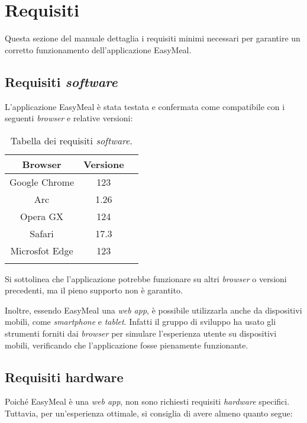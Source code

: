 \section{Requisiti}
Questa sezione del manuale dettaglia i requisiti minimi necessari per garantire 
un corretto funzionamento dell'applicazione EasyMeal.

\subsection{Requisiti \textit{software}}
L'applicazione EasyMeal è stata testata e confermata come compatibile con i 
seguenti \textit{browser} e relative versioni: 

\begin{longtable}{|c|c|c|}
	\hline
	\textbf{Browser}       & \textbf{ Versione}    \\
	\hline
    Google Chrome             & 123                    \\
    \hline
    Arc                       & 1.26                    \\
    \hline
    Opera GX                       & 124                    \\
    \hline
    Safari                        & 17.3                    \\
    \hline
    Microsfot Edge                 & 123                      \\
    \hline

    \caption{Tabella dei requisiti \textit{software}.}
\end{longtable}

Si sottolinea che l'applicazione potrebbe funzionare su altri \textit{browser} o versioni 
precedenti, ma il pieno supporto non è garantito.

Inoltre, essendo EasyMeal una \textit{web app}, è possibile utilizzarla anche
da dispositivi mobili, come \textit{smartphone} e \textit{tablet}. Infatti il gruppo di sviluppo ha usato gli strumenti forniti dai \textit{browser} per simulare l'esperienza utente 
su dispositivi mobili, verificando che l'applicazione fosse pienamente funzionante.


\subsection{Requisiti hardware}
Poiché EasyMeal è una \textit{web app}, non sono richiesti requisiti \textit{hardware} specifici. 
Tuttavia, per un'esperienza ottimale, si consiglia di avere almeno quanto segue:

